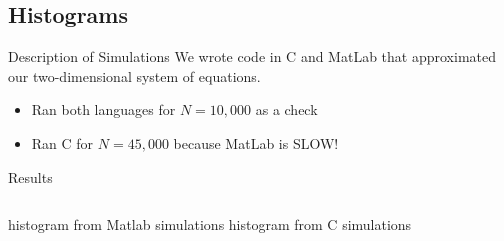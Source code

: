 
\subsection{Histograms}

\begin{frame}{Description of Simulations}
We wrote code in C and MatLab that approximated our two-dimensional system of equations. 
	\begin{itemize}
		\item Ran both languages for $N = 10,000$ as a check
		\item Ran C for $N =45,000$ because MatLab is SLOW!
	\end{itemize}
\end{frame}


\begin{frame}{Results}
 

  \begin{columns}[t]
    histogram from Matlab simulations
    histogram from C simulations
  \end{columns}


\end{frame}